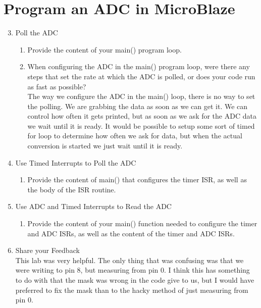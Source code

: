\documentclass[10pt,titlepage]{article}
\begin{document}
  \section*{Program an ADC in MicroBlaze}
    \begin{enumerate}
      \setcounter{enumi}{2}
      \item Poll the ADC 
      \begin{enumerate}
        \item Provide the content of your main() program loop.\\[1em]
          
            
        \item When configuring the ADC in the main() program loop, were there any steps that set the rate at which the ADC is polled, or does your code run as fast as possible?\\[1em]
          The way we configure the ADC in the main() loop, there is no way to set the polling. We are grabbing the data as soon as we can get it. We can control how often it gets printed, but as soon as we ask for the ADC data we wait until it is ready. It would be possible to setup some sort of timed for loop to determine how often we ask for data, but when the actual conversion is started we just wait until it is ready.
      \end{enumerate}

      \item Use Timed Interrupts to Poll the ADC
        \begin{enumerate}
          \item Provide the content of main() that configures the timer ISR, as well as the body of the ISR routine.\\[1em]
            
            
        \end{enumerate}

      \item Use ADC and Timed Interrupts to Read the ADC
        \begin{enumerate}
          \item Provide the content of your main() function needed to configure the timer and ADC ISRs, as well as the content of the timer and ADC ISRs.\\[1em]
            
        \end{enumerate}

      \item Share your Feedback\\[1em]
        This lab was very helpful. The only thing that was confusing was that we were writing to pin 8, but measuring from pin 0. I think this has something to do with that the mask was wrong in the code give to us, but I would have preferred to fix the mask than to the hacky method of just measuring from pin 0.
    \end{enumerate}
 
\end{document}
